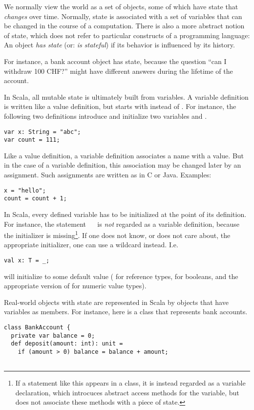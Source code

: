 \documentclass[a4paper,12pt,twoside,titlepage]{book}
\begin{document}
{We normally view the world as a set of objects, some of which have
state that {\em changes} over time.  Normally, state is associated
with a set of variables that can be changed in the course of a
computation.  There is also a more abstract notion of state, which
does not refer to particular constructs of a programming language: An
object {\em has state} (or: {\em is stateful}) if its behavior is
influenced by its history.

For instance, a bank account object has state, because the question
``can I withdraw 100 CHF?''
might have different answers during the lifetime of the account.

In Scala, all mutable state is ultimately built from variables.  A
variable definition is written like a value definition, but starts
with \verb@var@ instead of \verb@val@. For instance, the following two
definitions introduce and initialize two variables  and
.
\begin{lstlisting}
var x: String = "abc";
var count = 111;
\end{lstlisting}
Like a value definition, a variable definition associates a name with
a value. But in the case of a variable definition, this association
may be changed later by an assignment.  Such assignments are written
as in C or Java. Examples:
\begin{lstlisting}
x = "hello";
count = count + 1;
\end{lstlisting}
In Scala, every defined variable has to be initialized at the point of
its definition. For instance, the statement ~~ is
{\em not} regarded as a variable definition, because the initializer
is missing\footnote{If a statement like this appears in a class, it is
instead regarded as a variable declaration, which introcuces
abstract access methods for the variable, but does not associate these
methods with a piece of state.}. If one does not know, or does not
care about, the appropriate initializer, one can use a wildcard
instead. I.e.
\begin{lstlisting}
val x: T = _;
\end{lstlisting}
will initialize  to some default value ( for
reference types,  for booleans, and the appropriate
version of  for numeric value types).

Real-world objects with state are represented in Scala by objects that
have variables as members. For instance, here is a class that
represents bank accounts.
\begin{lstlisting}
class BankAccount {
  private var balance = 0;
  def deposit(amount: int): unit =
    if (amount > 0) balance = balance + amount;


\end{lstlisting}}
\end{document}
